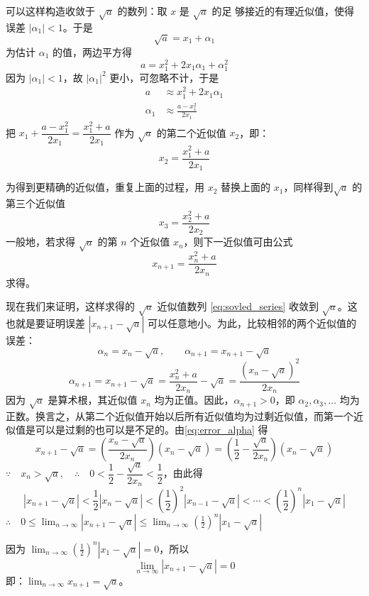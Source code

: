 \begin{solution}
可以这样构造收敛于 $\sqrt{a}$ 的数列：取 $x$ 是 $\sqrt{a}$ 的足
够接近的有理近似值，使得误差 $|\alpha_1|<1$。于是
\[\sqrt{a}=x_1+\alpha_1\]
为估计 $\alpha_1$ 的值，两边平方得
\[a=x^2_1+2x_1\alpha_1+\alpha_1^2\]
因为 $|\alpha_1|<1$，故 $|\alpha_1|^2$ 更小，可忽略不计，于是
\[\begin{split}
    a&\approx x^2_1+2x_1\alpha_1\\
    \alpha_1&\approx \frac{a-x^2_1}{2x_1}
\end{split}\]
把 $x_1+\dfrac{a-x^2_1}{2x_1}=\dfrac{x^2_1+a}{2x_1}$ 作为 $\sqrt{a}$ 的第二个近似值 $x_2$，即：
\[x_2=\frac{x^2_1+a}{2x_1}\]

为得到更精确的近似值，重复上面的过程，用 $x_2$ 替换上面的 $x_1$，同样得到$\sqrt{a}$ 的第三个近似值 
\[x_3=\frac{x^2_2+a}{2x_2}\]
一般地，若求得 $\sqrt{a}$ 的第 $n$ 个近似值 $x_n$，则下一近似值可由公式
\begin{equation}
  \label{eq:sovled_series}
  x_{n+1}=\frac{x^2_n+a}{2x_n}
\end{equation}
求得。

现在我们来证明，这样求得的 $\sqrt{a}$ 近似值数列 \eqref{eq:sovled_series} 收敛到 $\sqrt{a}$。这也就是要证明误差 $|x_{n+1}-\sqrt{a}|$ 可以任意地小。为此，比较相邻的两个近似值的误差：
\[\alpha_n=x_n-\sqrt{a},\qquad \alpha_{n+1}=x_{n+1}-\sqrt{a}\]
\begin{equation}
  \label{eq:error_alpha}
  \alpha_{n+1}=x_{n+1}-\sqrt{a}=\frac{x^2_n+a}{2x_n}-\sqrt{a}=\frac{\left(x_n-\sqrt{a}\right)^2}{2x_n}
\end{equation}
因为 $\sqrt{a}$ 是算术根，其近似值 $x_n$ 均为正值。因此，$\alpha_{n+1}>0$，即 $\alpha_2,\alpha_3,\ldots$ 均为正数。换言之，从第二个近似值开始以后所有近似值均为过剩近似值，而第一个近似值是可以是过剩的也可以是不足的。由\cref{eq:error_alpha} 得
\[x_{n+1}-\sqrt{a}=\left(\frac{x_n-\sqrt{a}}{2x_n}\right)\left(x_n-\sqrt{a}\right)=\left(\frac{1}{2}-\frac{\sqrt{a}}{2x_n}\right)\left(x_n-\sqrt{a}\right)\]
$\because\quad x_n>\sqrt{a},\quad \therefore\quad 0<\dfrac{1}{2}-\dfrac{\sqrt{a}}{2x_n}<\dfrac{1}{2}$，由此得
\[\left|x_{n+1}-\sqrt{a}\right|<\frac{1}{2}\left|x_n-\sqrt{a}\right|<\left(\frac{1}{2}\right)^2\left|x_{n-1}-\sqrt{a}\right|<\cdots <\left(\frac{1}{2}\right)^n\left|x_1-\sqrt{a}\right|\]
$\displaystyle\therefore\quad 0\leqslant \lim_{n\to\infty} \left|x_{n+1}-\sqrt{a}\right|\le \lim_{n\to\infty}\left(\frac{1}{2}\right)^n\left|x_1-\sqrt{a}\right|$

\medskip
因为 $\displaystyle \lim_{n\to\infty}\left(\frac{1}{2}\right)^n\left|x_1-\sqrt{a}\right|=0$，所以
\[\lim_{n\to\infty}\left|x_{n+1}-\sqrt{a}\right|=0\]
即：$\displaystyle\lim_{n\to\infty} x_{n+1}=\sqrt{a}$。
\end{solution}

